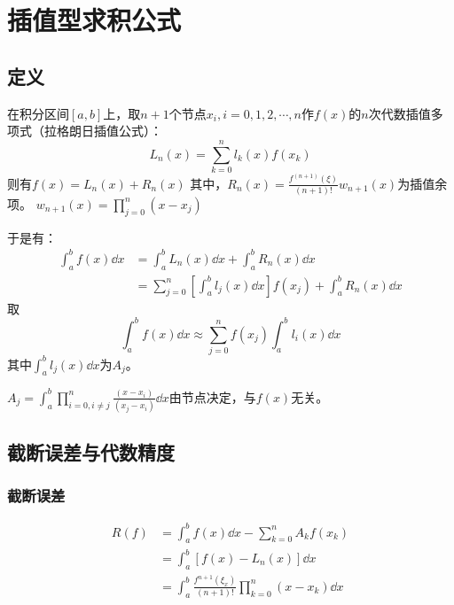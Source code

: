\section{插值型求积公式}

\subsection{定义}

\begin{definition}[拉格朗日插值公式]
    在积分区间$[a,b]$上，取$n+1$个节点$x_i,i=0,1,2,\cdots,n$作$f(x)$的$n$次代数插值多项式（拉格朗日插值公式）：
    \begin{equation*}
        L_n(x) = \sum_{k=0}^{n}l_k(x)f(x_k)
    \end{equation*}
    则有$f(x) = L_n(x)+R_n(x)$
    其中，$R_n(x) = \frac{f^{(n+1)}(\xi)}{(n+1)!}w_{n+1}(x)$为插值余项。
    $w_{n+1}(x) = \prod_{j=0}^{n}(x-x_j)$
\end{definition}

于是有：
\begin{align*}
    \int_{a}^{b}f(x)\dd{x} &= \int_{a}^{b}L_n(x)\dd{x}+\int_{a}^{b}R_n(x)\dd{x} \\
    &= \sum_{j=0}^{n}[\int_{a}^{b}l_j(x)\dd{x}]f(x_j)+\int_{a}^{b}R_n(x)\dd{x}
\end{align*}
取
\begin{equation*}
    \int_{a}^{b}f(x)\dd{x} \approx \sum_{j=0}^{n}f(x_j)\int_{a}^{b}l_i(x)\dd{x}
\end{equation*}
其中$\int_{a}^{b} l_j(x)\dd{x}$为$A_j$。

$A_j = \int_{a}^{b} \prod_{i=0,i\neq j}^{n}\frac{(x-x_i)}{(x_j-x_i)}\dd{x}$由节点决定，与$f(x)$无关。


\subsection{截断误差与代数精度}

\subsubsection{截断误差}
\begin{align*}
    R(f) &= \int_{a}^{b}f(x)\dd{x} - \sum_{k=0}^{n}A_kf(x_k) \\
    &= \int_{a}^{b}[f(x)-L_n(x)]\dd{x} \\
    &= \int_{a}^{b}\frac{f^{n+1}(\xi_x)}{(n+1)!}\prod_{k=0}^{n}(x-x_k)\dd{x}
\end{align*}

